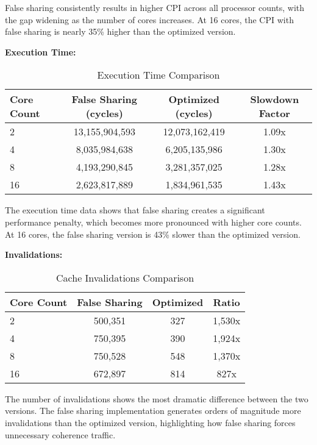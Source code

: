 \documentclass[9pt]{IEEEtran}
\begin{document}
False sharing consistently results in higher CPI across all processor counts, with the gap widening as the number of cores increases. At 16 cores, the CPI with false sharing is nearly 35\% higher than the optimized version.

\textbf{Execution Time:}

\begin{table}[htbp]
\centering
\caption{Execution Time Comparison}
\begin{adjustbox}{max width=\columnwidth}
\begin{tabular}{@{}lccc@{}}
\toprule
Core Count & False Sharing (cycles) & Optimized (cycles) & Slowdown Factor \\
\midrule
2  & 13,155,904,593 & 12,073,162,419 & 1.09x \\
4  & 8,035,984,638  & 6,205,135,986  & 1.30x \\
8  & 4,193,290,845  & 3,281,357,025  & 1.28x \\
16 & 2,623,817,889  & 1,834,961,535  & 1.43x \\
\bottomrule
\end{tabular}
\end{adjustbox}
\end{table}

The execution time data shows that false sharing creates a significant performance penalty, which becomes more pronounced with higher core counts. At 16 cores, the false sharing version is 43\% slower than the optimized version.

\textbf{Invalidations:}

\begin{table}[htbp]
\centering
\caption{Cache Invalidations Comparison}
\begin{adjustbox}{max width=\columnwidth}
\begin{tabular}{@{}lccc@{}}
\toprule
Core Count & False Sharing & Optimized & Ratio \\
\midrule
2  & 500,351 & 327 & 1,530x \\
4  & 750,395 & 390 & 1,924x \\
8  & 750,528 & 548 & 1,370x \\
16 & 672,897 & 814 & 827x \\
\bottomrule
\end{tabular}
\end{adjustbox}
\end{table}

The number of invalidations shows the most dramatic difference between the two versions. The false sharing implementation generates orders of magnitude more invalidations than the optimized version, highlighting how false sharing forces unnecessary coherence traffic.
\end{document}

